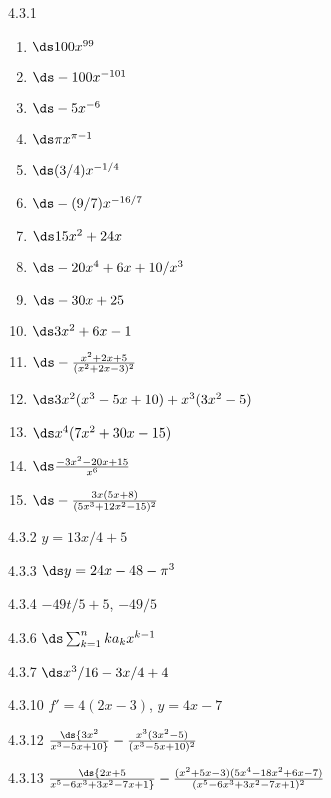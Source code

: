 \begin{Answer}{4.3.1}
\begin{multicols}{3}
\begin{enumerate}
	\item	$\ds 100x^{99}$
	\item	$\ds -100x^{-101}$
	\item	$\ds -5x^{-6}$
	\item	$\ds \pi x^{\pi-1}$
	\item	$\ds (3/4)x^{-1/4}$
	\item	$\ds -(9/7)x^{-16/7}$
	\item	$\ds 15x^2+24x$
	\item	$\ds -20x^4+6x+10/x^3$
	\item	$\ds -30x+25$
	\item	$\ds 3x^2+6x-1$
	\item	$\ds -\frac{x^2+2x+5}{(x^2+2x-3)^2}$
	\item	$\ds 3x^2(x^3-5x+10)+x^3(3x^2-5)$
	\item	$\ds x^4(7x^2+30x-15)$
	\item	$\ds\frac{-3x^2-20x+15}{x^6}$
	\item	$\ds -\frac{3x(5x+8)}{(5x^3+12x^2-15)^2}$
\end{enumerate}
\end{multicols}
\end{Answer}
\begin{Answer}{4.3.2}
$y=13x/4+5$
\end{Answer}
\begin{Answer}{4.3.3}
$\ds y=24x-48-\pi^3$
\end{Answer}
\begin{Answer}{4.3.4}
$-49t/5+5$, $-49/5$
\end{Answer}
\begin{Answer}{4.3.6}
$\ds\sum_{k=1}^n ka_kx^{k-1}$
\end{Answer}
\begin{Answer}{4.3.7}
$\ds x^3/16-3x/4+4$
\end{Answer}
\begin{Answer}{4.3.10}
$f'=4(2x-3)$, $y=4x-7$
\end{Answer}
\begin{Answer}{4.3.12}
$\ds {3x^2\over x^3-5x+10}-{x^3(3x^2-5)\over (x^3-5x+10)^2}$
\end{Answer}
\begin{Answer}{4.3.13}
$\ds {2x+5\over x^5-6x^3+3x^2-7x+1}-{(x^2+5x-3)(5x^4-18x^2+6x-7)\over(x^5-6x^3+3x^2-7x+1)^2}$
\end{Answer}
